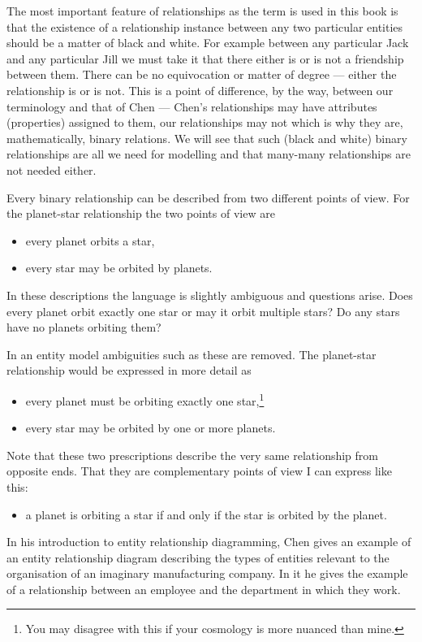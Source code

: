 \mynote The most important feature of relationships as the term is used  in this book is that the existence of a relationship instance between any two particular entities should be a matter of black and white. For example between any particular Jack and any particular Jill we must take it that there either is or is not a friendship between them. There can be no equivocation or matter of degree --- either the relationship is or is not. This is a point of difference, by the way, between our terminology and that of Chen --- Chen's relationships may have attributes (properties) assigned to them, our relationships may not which is why they are, mathematically, binary relations. We will see that such (black and white) binary relationships are all we need for modelling and that many-many relationships are not needed either. 

\mynote 
Every binary relationship can be described from two different points of view. 
For the planet-star relationship the two points of view are
\begin{itemize}
\item every planet orbits a star,
\item every star may be orbited by planets.
\end{itemize}

In these descriptions the language is slightly ambiguous and questions arise.
Does every planet orbit exactly one star or may it orbit multiple stars? Do any stars have no planets orbiting them?

In an entity model ambiguities such as these are removed. 
The planet-star relationship would be expressed in more detail as
\begin{itemize}
\item every planet must be orbiting exactly one star,\footnote{You may disagree with this if your cosmology is more nuanced than mine.}
\item every star may be orbited by one or more planets.
\end{itemize}

Note that these two prescriptions describe the very same relationship from opposite ends. That they are complementary points of view I can express like this:

\begin{itemize}
\item a planet is orbiting a star if and only if the star is orbited by the planet.
\end{itemize}

\mynote
In his introduction to entity relationship diagramming, Chen gives an example of an entity relationship diagram describing the types of entities relevant to the organisation of an imaginary manufacturing company.
In it he gives the example of a relationship between an employee and the department in which they work. 

